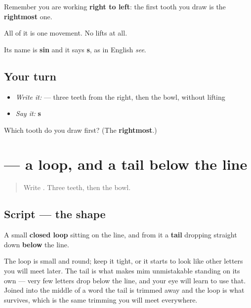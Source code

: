 Remember you are working \textbf{right to left}: the first tooth you draw is the \textbf{rightmost} one.

All of it is one movement. No lifts at all.

Its name is \textbf{sin} and it says \textbf{s}, as in English \emph{see}.

\subsection*{Your turn}
\begin{itemize}
\raggedright
  \item \emph{Write it:}  — three teeth from the right, then the bowl, without lifting
  \item \emph{Say it:} \textbf{s}
\end{itemize}

\begin{tcolorbox}[breakable,colback=teal!4,colframe=teal!35!black,title={Before you move on}]
Which tooth do you draw first? (The \textbf{rightmost}.)
\end{tcolorbox}
\section[\texorpdfstring{\fa{م} (mim)}{م (mim)}]{ — a loop, and a tail below the line}

\label{lesson:FA-W15-mim}



\begin{quote}
Write . Three teeth, then the bowl.
\end{quote}

\subsection*{Script — the shape}

\begin{quote}
\end{quote}

A small \textbf{closed loop} sitting on the line, and from it a \textbf{tail} dropping straight down \textbf{below} the line.

The loop is small and round; keep it tight, or it starts to look like other letters you will meet later. The tail is what makes mim unmistakable standing on its own — very few letters drop below the line, and your eye will learn to use that. Joined into the middle of a word the tail is trimmed away and the loop is what survives, which is the same trimming you will meet everywhere.

